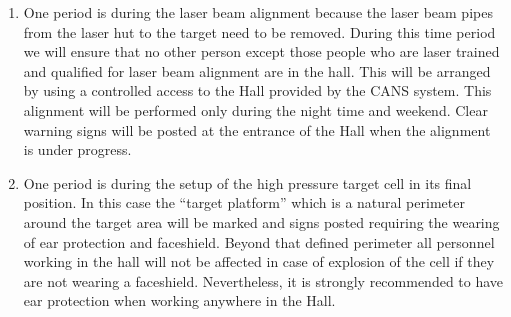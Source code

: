 \begin{safetyen}{10}{5}
\begin{enumerate}

\item One period is during the laser beam alignment because the laser
beam pipes
from the laser hut to the  target need to be removed. During this time
period we
will ensure that no other person except those people who are laser
trained and qualified  for
laser beam alignment are in the hall. This will be arranged by using a
controlled access 
to the Hall provided by the CANS system.
This alignment 
will be performed only during the night time and weekend. 
Clear warning signs will
be posted  at the
entrance of the Hall when the alignment is under progress.

\item One period is during the setup of the high pressure target cell in
its final position. 
In this case the ``target platform'' which is a natural perimeter around
the target area 
 will be marked  and signs posted requiring the wearing of ear
protection and
faceshield. Beyond that defined perimeter all personnel working in the
hall
will not be affected in case of explosion of the cell if they are not 
wearing  a faceshield. Nevertheless, it is strongly recommended to have 
ear protection when working anywhere in the Hall. 
\end{enumerate}
\end{safetyen}

%
%
%

